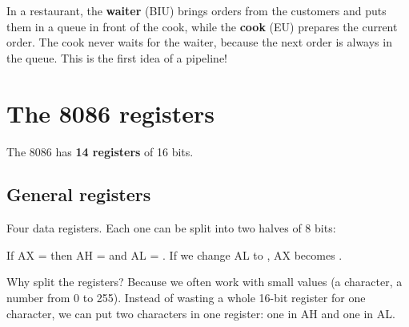 \begin{tashbih}
    In a restaurant, the \textbf{waiter} (BIU) brings orders from the customers and puts them in a queue in front of
    the cook, while the \textbf{cook} (EU) prepares the current order. The cook never waits for the waiter, because
    the next order is always in the queue. This is the first idea of a pipeline!
\end{tashbih}

\section{The 8086 registers}

The 8086 has \textbf{14 registers} of 16 bits.

\subsection{General registers}
Four data registers. Each one can be split into two halves of 8 bits:

\begin{center}
\end{center}

\begin{mithal}
    If AX =  then AH =  and AL = . If we change AL to , AX becomes .
\end{mithal}

Why split the registers? Because we often work with small values (a character, a number from 0 to 255).
Instead of wasting a whole 16-bit register for one character, we can put two characters in one register:
one in AH and one in AL.

